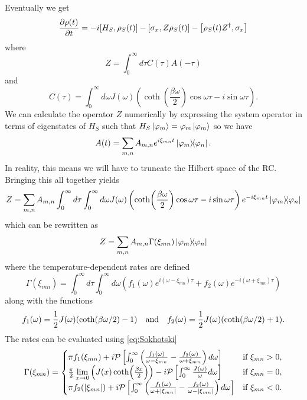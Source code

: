 \documentclass[]{article}
\begin{document}
Eventually we get
\begin{equation}
\label{nRWA_master}
\pdv{\rho(t)}{t} = -i[H_S, \rho_S(t)] - \left[\sigma_x, Z\rho_S(t)\right] - \left[\rho_S(t) Z^{\dagger}, \sigma_x\right]
\end{equation}
where
\begin{equation}
Z = \int_{0}^{\infty}d\tau C(\tau)A(-\tau)
\end{equation}
and
\begin{equation}
C(\tau) = \int_{0}^{\infty}d\omega J(\omega)\left(\coth(\frac{\beta \omega}{2}) \cos\omega\tau - i\sin\omega\tau\right).
\end{equation}
We can calculate the operator $Z$ numerically by expressing the system operator in terms of eigenstates of $H_S$ such that $H_S\ket{\varphi_m}=\varphi_m\ket{\varphi_m}$ so we have
\begin{equation}
\label{eq:Adecomposition}
A(t) = \sum_{m,n} A_{m,n} e^{i\xi_{mn}t}\dyad{\varphi_m}{\varphi_n}.
\end{equation}
In reality, this means we will have to truncate the Hilbert space of the RC. Bringing this all together yields
\begin{equation}
Z = \sum_{m,n} A_{m,n} \int_{0}^{\infty}d\tau \int_{0}^{\infty}d\omega J(\omega)\left(\coth(\frac{\beta \omega}{2}) \cos\omega\tau - i\sin\omega\tau\right)e^{-i\xi_{mn}t}\dyad{\varphi_m}{\varphi_n}
\end{equation}
which can be rewritten as
\begin{equation}
Z = \sum_{m,n} A_{m,n} \Gamma(\xi_{mn}) \dyad{\varphi_m}{\varphi_n}
\end{equation}
where the temperature-dependent rates are defined
\begin{equation}
\Gamma(\xi_{mn}) = \int_{0}^{\infty}d\tau \int_{0}^{\infty}d\omega \left(f_1(\omega)e^{i(\omega-\xi_{mn})\tau} + f_2(\omega)e^{-i(\omega+\xi_{mn})\tau}\right)
\end{equation}
along with the functions
\begin{equation}
f_1(\omega) = \frac{1}{2}J(\omega)(\coth(\beta \omega/2)-1) \quad \textnormal{and} \quad f_2(\omega)= \frac{1}{2}J(\omega)(\coth(\beta \omega/2)+1).
\end{equation}
The rates can be evaluated using \ref{eq:Sokhotski}
\begin{equation}
\Gamma(\xi_{mn}) =
\begin{cases}
\pi f_1(\xi_{mn}) + i\mathcal{P}\left[\int_{0}^{\infty}\left(\frac{f_1(\omega)}{\omega-\xi_{mn}} - \frac{f_2(\omega)}{\omega+\xi_{mn}}\right)d\omega\right] & \text{if } \xi_{mn}>0,\\ 
\frac{\pi}{2}\lim\limits_{x\to 0}\left(J(x)\coth(\frac{\beta x}{2})\right) - i\mathcal{P}\left[\int_{0}^{\infty}\frac{J(\omega)}{\omega}d\omega\right] & \text{if } \xi_{mn}=0,\\ 
\pi f_2(\abs{\xi_{mn}}) + i\mathcal{P}\left[\int_{0}^{\infty}\left(\frac{f_1(\omega)}{\omega+\abs{\xi_{mn}}} - \frac{f_2(\omega)}{\omega-\abs{\xi_{mn}}}\right)d\omega\right]  & \text{if } \xi_{mn}<0.
\end{cases}
\end{equation}
\end{document}
